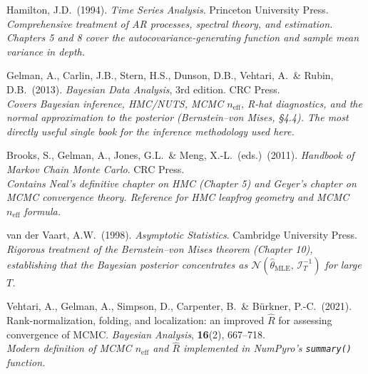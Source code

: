 \documentclass[11pt, a4paper]{article}
\begin{document}
\begin{description}[leftmargin=0pt, itemsep=4pt]
\item[Hamilton (1994)]
Hamilton, J.D.\ (1994).
\textit{Time Series Analysis}.
Princeton University Press.\\
\textit{Comprehensive treatment of AR processes, spectral theory, and estimation.
Chapters 5 and 8 cover the autocovariance-generating function and sample mean
variance in depth.}

\item[Gelman et al.\ (2013)]
Gelman, A., Carlin, J.B., Stern, H.S., Dunson, D.B., Vehtari, A.\ \& Rubin, D.B.\
(2013).
\textit{Bayesian Data Analysis}, 3rd edition.
CRC Press.\\
\textit{Covers Bayesian inference, HMC/NUTS, MCMC $n_\mathrm{eff}$, R-hat
diagnostics, and the normal approximation to the posterior
(Bernstein--von Mises, \S4.4).
The most directly useful single book for the inference methodology used here.}

\item[Brooks et al.\ (2011)]
Brooks, S., Gelman, A., Jones, G.L.\ \& Meng, X.-L.\ (eds.)\ (2011).
\textit{Handbook of Markov Chain Monte Carlo}.
CRC Press.\\
\textit{Contains Neal's definitive chapter on HMC (Chapter 5) and Geyer's
chapter on MCMC convergence theory. Reference for HMC leapfrog geometry and
MCMC $n_\mathrm{eff}$ formula.}

\item[van der Vaart (1998)]
van der Vaart, A.W.\ (1998).
\textit{Asymptotic Statistics}.
Cambridge University Press.\\
\textit{Rigorous treatment of the Bernstein--von Mises theorem (Chapter 10),
establishing that the Bayesian posterior concentrates as
$\mathcal{N}(\hat\theta_\mathrm{MLE},\,\mathcal{I}_T^{-1})$ for large $T$.}

\item[Vehtari et al.\ (2021)]
Vehtari, A., Gelman, A., Simpson, D., Carpenter, B.\ \& B\"urkner, P.-C.\ (2021).
Rank-normalization, folding, and localization: an improved $\hat R$ for assessing
convergence of MCMC.
\textit{Bayesian Analysis}, \textbf{16}(2), 667--718.\\
\textit{Modern definition of MCMC $n_\mathrm{eff}$ and $\hat R$ implemented in
NumPyro's \texttt{summary()} function.}

\end{description}
\end{document}
